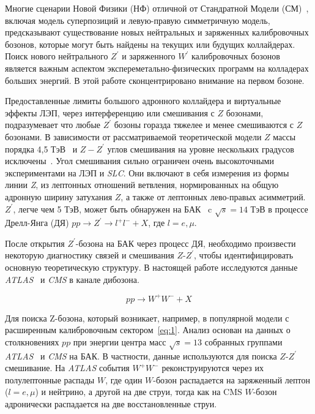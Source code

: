 Многие сценарии Новой Физики (НФ) отличной от Стандратной Модели (СМ)~\cite{2part-1}, включая модель суперпозиций и левую-правую симметричную модель, предсказывают существование новых нейтральных и заряженных калибровочных бозонов, которые могут быть найдены на текущих или будущих коллайдерах. Поиск нового нейтрального $Z^\prime$ и заряженного $W^\prime$ калибровочных бозонов является важным аспектом экспереметально-физических программ на колладерах больших энергий. В этой работе сконцентрировано внимание на первом бозоне.

Предоставленные лимиты большого адронного коллайдера и виртуальные эффекты ЛЭП, через интерференцию или смешивания с $Z$ бозонами, подразумевает что любые $Z^\prime$ бозоны горазда тяжелее и менее смешиваются с $Z$ бозонами. В зависимости от рассматриваемой теоретической модели $Z$ массы порядка 4,5 ТэВ~\cite{2part-pankov} и $Z-Z^\prime$ углов смешивания на уровне нескольких градусов исключены~\cite{sirunyan:2017}. Угол смешивания сильно ограничен очень высокоточными экспериментами на ЛЭП и \textit{SLC}. Они включают в себя измерения из формы линии \textit{Z}, из лептонных отношений ветвления, нормированных на общую адронную ширину затухания $Z$, а также от лептонных лево-правых асимметрий. $Z^\prime$, легче чем 5 ТэВ, может быть обнаружен на БАК~\cite{sirunyan:2017} c $\sqrt{s} = 14 $ ТэВ в процессе Дрелл-Янга (ДЯ) $pp \rightarrow Z^\prime \rightarrow l^+l^- + X$, где $l=e,\mu$.

После открытия $Z^\prime$-бозона на БАК через процесс ДЯ, необходимо произвести некоторую диагностику связей и смешивания $Z$-$Z^\prime$, чтобы идентифицировать основную теоретическую структуру. В настоящей работе исследуются данные \textit{ATLAS}~\cite{main-book} и \textit{CMS} в канале дибозона.

\begin{equation} \label{eq:1}
pp \rightarrow W^+W^- + X
\end{equation}

Для поиска Z-бозона, который возникает, например, в популярной модели с расширенным калибровочным сектором~\ref{eq:1}. Анализ основан на данных о столкновениях $pp$ при энергии центра масс $\sqrt{s} = 13 $ собранных группами \textit{ATLAS}~\cite{main-book} и \textit{CMS} на БАК. В частности, данные используются для поиска $Z$-$Z^\prime$ смешивание. На \textit{ATLAS} события $W^+W^-$ реконструируются через их полулептонные распады $W$, где один $W$-бозон распадается на заряженный лептон ($l=e,\mu$) и нейтрино, а другой на две струи, тогда как на CMS $W$-бозон адронически распадается на две восстановленные струи. 

